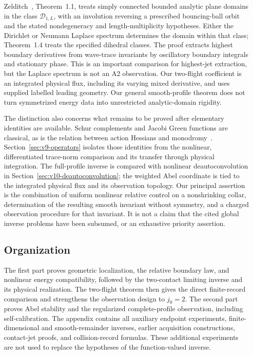 Zelditch~\cite{Zelditch}, Theorem~1.1, treats simply connected bounded
analytic plane domains in the class $\mathcal D_{1,L}$, with an
involution reversing a prescribed bouncing-ball orbit and the stated
nondegeneracy and length-multiplicity hypotheses. Either the Dirichlet
or Neumann Laplace spectrum determines the domain within that class;
Theorem~1.4 treats the specified dihedral classes. The proof extracts
highest boundary derivatives from wave-trace invariants by oscillatory
boundary integrals and stationary phase. This is an important comparison
for highest-jet extraction, but the Laplace spectrum is not an A2
observation. Our two-flight coefficient is an integrated physical flux,
including its varying mixed derivative, and uses supplied labelled
leading geometry. Our general smooth-profile theorem does not turn
symmetrized energy data into unrestricted analytic-domain rigidity.

The distinction also concerns what remains to be proved after elementary
identities are available. Schur complements and Jacobi Green functions
are classical, as is the relation between action Hessians and
monodromy~\cite{Hill}. Section~\ref{sec:v9-operators} isolates those
identities from the nonlinear, differentiated trace-norm comparison
and its transfer through physical integration. The full-profile inverse
is compared with nonlinear deautoconvolution in
Section~\ref{sec:v10-deautoconvolution}; the weighted Abel coordinate
is tied to the integrated physical flux and its observation topology.
Our principal assertion is the combination of uniform nonlinear relative
control on a nonshrinking collar, determination of the resulting
smooth invariant without symmetry, and a charged observation procedure
for that invariant. It is not a claim that the cited global inverse
problems have been subsumed, or an exhaustive priority assertion.

\subsection{Organization}
The first part proves geometric localization, the relative boundary law,
and nonlinear energy compatibility, followed by the two-contact limiting
inverse and its physical realization. The two-flight theorem then gives
the direct finite-record comparison and strengthens the observation
design to $j_0=2$. The second part proves Abel stability and the
regularized complete-profile observation, including self-calibration.
The appendix contains all auxiliary endpoint experiments,
finite-dimensional and smooth-remainder inverses, earlier acquisition
constructions, contact-jet proofs, and collision-record formulas.
These additional experiments are not used to replace the hypotheses
of the function-valued inverse.
